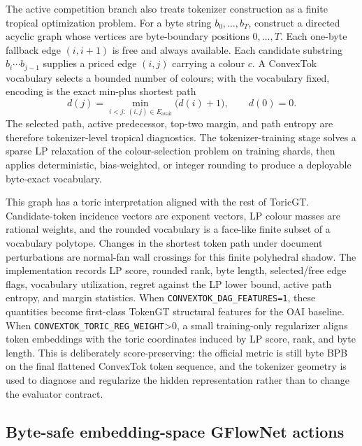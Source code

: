 \documentclass[11pt]{article}
\theoremstyle{definition}
\theoremstyle{plain}
\theoremstyle{remark}
\numberwithin{equation}{section}
\begin{document}
The active competition branch also treats tokenizer construction as a finite
tropical optimization problem.  For a byte string $b_0,\ldots,b_T$, construct a
directed acyclic graph whose vertices are byte-boundary positions
$0,\ldots,T$.  Each one-byte fallback edge $(i,i+1)$ is free and always
available.  Each candidate substring $b_i\cdots b_{j-1}$ supplies a priced edge
$(i,j)$ carrying a colour $c$.  A ConvexTok vocabulary selects a bounded number
of colours; with the vocabulary fixed, encoding is the exact min-plus shortest
path
\begin{equation}
  d(j)=\min_{i<j:\,(i,j)\in E_{\mathrm{avail}}}\bigl(d(i)+1\bigr),
  \qquad d(0)=0.
\end{equation}
The selected path, active predecessor, top-two margin, and path entropy are
therefore tokenizer-level tropical diagnostics.  The tokenizer-training stage
solves a sparse LP relaxation of the colour-selection problem on training
shards, then applies deterministic, bias-weighted, or integer rounding to
produce a deployable byte-exact vocabulary.

This graph has a toric interpretation aligned with the rest of ToricGT.
Candidate-token incidence vectors are exponent vectors, LP colour masses are
rational weights, and the rounded vocabulary is a face-like finite subset of a
vocabulary polytope.  Changes in the shortest token path under document
perturbations are normal-fan wall crossings for this finite polyhedral shadow.
The implementation records LP score, rounded rank, byte length, selected/free
edge flags, vocabulary utilization, regret against the LP lower bound, active
path entropy, and margin statistics.  When
\texttt{CONVEXTOK\_DAG\_FEATURES=1}, these quantities become first-class
TokenGT structural features for the OAI baseline.  When
\texttt{CONVEXTOK\_TORIC\_REG\_WEIGHT}>0, a small training-only regularizer
aligns token embeddings with the toric coordinates induced by LP score, rank,
and byte length.  This is deliberately score-preserving: the official metric is
still byte BPB on the final flattened ConvexTok token sequence, and the
tokenizer geometry is used to diagnose and regularize the hidden
representation rather than to change the evaluator contract.

\subsection{Byte-safe embedding-space GFlowNet actions}
\end{document}
